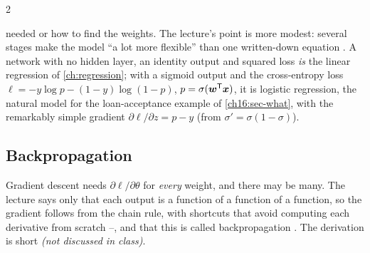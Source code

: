 \begin{paracol}{2}
\begin{remark}
needed or how to find the weights. The lecture's point is more modest: several stages make the model ``a lot more flexible'' than one written-down equation . A network with no hidden layer, an identity output and squared loss \emph{is} the linear regression of
\cref{ch:regression}; with a sigmoid output and the cross-entropy loss $\ell=-y\log p-(1-y)\log(1-p)$, $p=\sigma(\bm w^{\mathsf T}\bm x)$, it is logistic regression, the natural model for the loan-acceptance example of \cref{ch16:sec-what}, with the remarkably simple gradient
$\partial\ell/\partial z=p-y$ (from $\sigma'=\sigma(1-\sigma)$).
\end{remark}

\subsection{Backpropagation}
Gradient descent needs $\partial\ell/\partial\theta$ for \emph{every} weight, and there may be many. The lecture says only that each output is a function of a function of a function, so the gradient follows from the chain rule, with shortcuts that avoid computing each derivative from scratch
--, and that this is called backpropagation . The derivation is short \emph{(not discussed in class)}.


\end{paracol}

